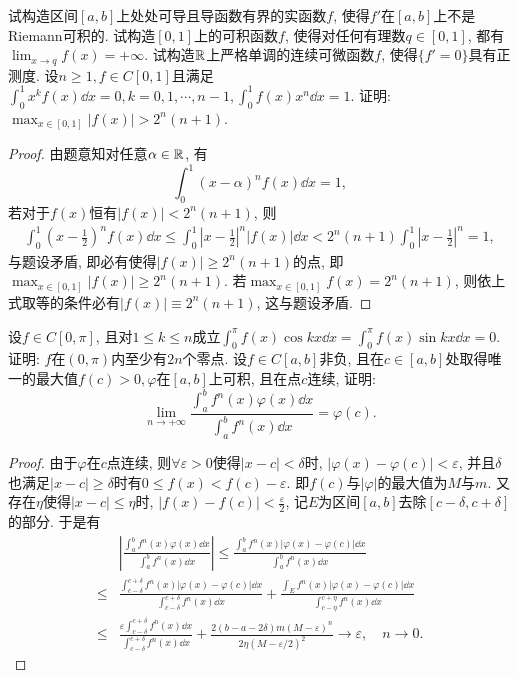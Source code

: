 \begin{quizb}
\woe 试构造区间\([a,b]\)上处处可导且导函数有界的实函数\(f\), 使得\(f'\)在\([a,b]\)上不是Riemann可积的.
\woe 试构造\([0,1]\)上的可积函数\(f\), 使得对任何有理数\(q\in[0,1]\), 都有\(\lim_{x\rightarrow q}f(x)=+\infty\).
\woe 试构造\(\mathbb{R}\)上严格单调的连续可微函数\(f\), 使得\(\{f'=0\}\)具有正测度.
\woe 设\(n\geqslant 1, f\in C[0,1]\)且满足\(\int_{0}^{1}x^kf(x)\dd x=0,k=0,1,\cdots,n-1,\int_{0}^{1}f(x)x^n\dd x=1.\) 证明: \(\max_{x\in[0,1]}|f(x)|>2^n(n+1)\).
\begin{proof}
由题意知对任意\(\alpha\in\mathbb{R}\), 有\[\int_{0}^{1}\left(x-\alpha\right)^nf(x)\dd x=1,\]若对于\(f(x)\)恒有\(|f(x)|<2^n(n+1)\), 则\[\begin{split}
\int_{0}^{1}\left(x-\frac{1}{2}\right)^nf(x)\dd x\leqslant\int_{0}^{1}\left|x-\frac{1}{2}\right|^n|f(x)|\dd x<2^n(n+1)\int_{0}^{1}\left|x-\frac{1}{2}\right|^n=1,
\end{split}\]与题设矛盾, 即必有使得\(|f(x)|\geqslant 2^n(n+1)\)的点, 即\(\max_{x\in[0,1]}|f(x)|\geqslant 2^n(n+1)\). 若\(\max_{x\in[0,1]}f(x)=2^n(n+1)\), 则依上式取等的条件必有\(|f(x)|\equiv 2^n(n+1)\), 这与题设矛盾.
\end{proof}
\woe 设\(f\in C[0,\pi]\), 且对\(1\leqslant k\leqslant n\)成立\(\int_{0}^{\pi}f(x)\cos kx\dd x=\int_{0}^{\pi}f(x)\sin kx\dd x=0\). 证明: \(f\)在\((0,\pi)\)内至少有\(2n\)个零点.
\woe 设\(f\in C[a,b]\)非负, 且在\(c\in[a,b]\)处取得唯一的最大值\(f(c)>0,\varphi\)在\([a,b]\)上可积, 且在点\(c\)连续, 证明: \[\lim_{n\rightarrow+\infty}\frac{\displaystyle\int_{a}^{b}f^n(x)\varphi(x)\dd x}{\displaystyle\int_{a}^{b}f^n(x)\dd x}=\varphi(c).\]
\begin{proof}
由于\(\varphi\)在\(c\)点连续, 则\(\forall \varepsilon>0\)使得\(|x-c|<\delta\)时, \(|\varphi(x)-\varphi(c)|<\varepsilon\), 并且\(\delta\)也满足\(|x-c|\geqslant\delta\)时有\(0\leqslant f(x)<f(c)-\varepsilon\). 即\(f(c)\)与\(|\varphi|\)的最大值为\(M\)与\(m\). 又存在\(\eta\)使得\(|x-c|\leqslant\eta\)时, \(|f(x)-f(c)|<\frac{\varepsilon}{2}\), 记\(E\)为区间\([a,b]\)去除\([c-\delta,c+\delta]\)的部分. 于是有\[\begin{split}
&\left|\frac{\displaystyle\int_{a}^{b}f^n(x)\varphi(x)\dd x}{\displaystyle\int_{a}^{b}f^n(x)\dd x}\right|\leqslant\frac{\displaystyle\int_{a}^{b}f^n(x)|\varphi(x)-\varphi(c)|\dd x}{\displaystyle\int_{a}^{b}f^n(x)\dd x}\\\leqslant&\frac{\displaystyle\int_{c-\delta}^{c+\delta}f^n(x)|\varphi(x)-\varphi(c)|\dd x}{\displaystyle\int_{c-\delta}^{c+\delta}f^n(x)\dd x}+\frac{\displaystyle\int_{E}f^n(x)|\varphi(x)-\varphi(c)|\dd x}{\displaystyle\int_{c-\eta}^{c+\eta}f^n(x)\dd x}\\\leqslant&\frac{\varepsilon\displaystyle\int_{c-\delta}^{c+\delta}f^n(x)\dd x}{\displaystyle\int_{c-\delta}^{c+\delta}f^n(x)\dd x}+\frac{2(b-a-2\delta)m(M-\varepsilon)^n}{2\eta(M-\varepsilon/2)^2}\rightarrow \varepsilon,\quad n\rightarrow 0.

\end{split}\]
\end{proof}
\end{quizb}
